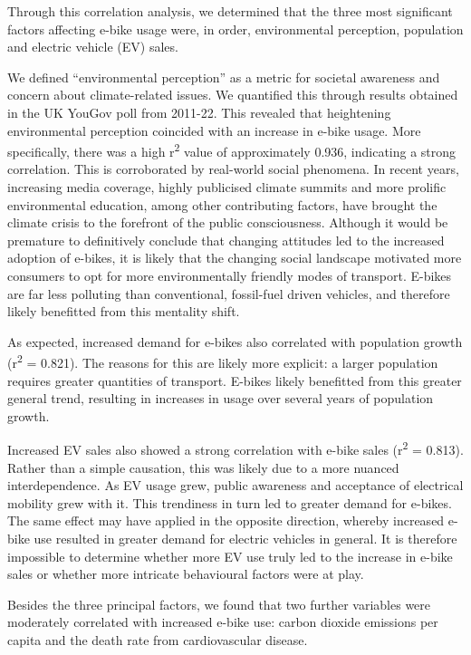 Through this correlation analysis, we determined that the three most significant factors affecting e-bike usage were, in order, environmental perception, population and electric vehicle (EV) sales.

We defined ``environmental perception'' as a metric for societal awareness and concern about climate-related issues. We quantified this through results obtained in the UK YouGov poll from 2011-22. This revealed that heightening environmental perception coincided with an increase in e-bike usage. More specifically, there was a high r\textsuperscript{2} value of approximately 0.936, indicating a strong correlation. This is corroborated by real-world social phenomena. In recent years, increasing media coverage, highly publicised climate summits and more prolific environmental education, among other contributing factors, have brought the climate crisis to the forefront of the public consciousness. Although it would be premature to definitively conclude that changing attitudes led to the increased adoption of e-bikes, it is likely that the changing social landscape motivated more consumers to opt for more environmentally friendly modes of transport. E-bikes are far less polluting than conventional, fossil-fuel driven vehicles, and therefore likely benefitted from this mentality shift.

As expected, increased demand for e-bikes also correlated with population growth (r\textsuperscript{2} = 0.821). The reasons for this are likely more explicit: a larger population requires greater quantities of transport. E-bikes likely benefitted from this greater general trend, resulting in increases in usage over several years of population growth.

Increased EV sales also showed a strong correlation with e-bike sales (r\textsuperscript{2} = 0.813). Rather than a simple causation, this was likely due to a more nuanced interdependence. As EV usage grew, public awareness and acceptance of electrical mobility grew with it. This trendiness in turn led to greater demand for e-bikes. The same effect may have applied in the opposite direction, whereby increased e-bike use resulted in greater demand for electric vehicles in general. It is therefore impossible to determine whether more EV use truly led to the increase in e-bike sales or whether more intricate behavioural factors were at play.

Besides the three principal factors, we found that two further variables were moderately correlated with increased e-bike use: carbon dioxide emissions per capita and the death rate from cardiovascular disease.

